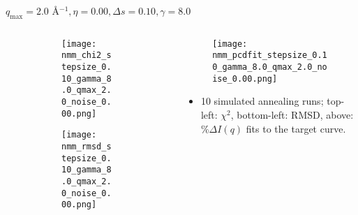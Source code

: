 \documentclass{beamer}
\begin{document}
\begin{frame}{$ q_{\textrm{max}}=2.0 $ \AA $^{-1}, \eta=0.00, \Delta s=0.10, \gamma=8.0$}
	\begin{columns}
		\begin{column}{.5\textwidth}
			\begin{figure}[H]
			\centering
			\begin{subfigure}[b]{\textwidth}
				\centering
				\texttt{[image: nmm\_chi2\_stepsize\_0.10\_gamma\_8.0\_qmax\_2.0\_noise\_0.00.png]}
				\label{fig:}
			\end{subfigure}
			\begin{subfigure}[b]{\textwidth}
				\centering
				\texttt{[image: nmm\_rmsd\_stepsize\_0.10\_gamma\_8.0\_qmax\_2.0\_noise\_0.00.png]}
				\label{fig:}
			\end{subfigure}
			\end{figure}
		\end{column}
		\begin{column}{.5\textwidth}
			\begin{figure}[H]
				\centering
				\texttt{[image: nmm\_pcdfit\_stepsize\_0.10\_gamma\_8.0\_qmax\_2.0\_noise\_0.00.png]}
				\label{fig:}
			\end{figure}
			\begin{itemize}
				\item 10 simulated annealing runs; top-left: $\chi^2$, bottom-left: RMSD, above: $\%\Delta I(q)$ fits to the target curve.
			\end{itemize}
		\end{column}
	\end{columns}
\end{frame}
 
\end{document}
